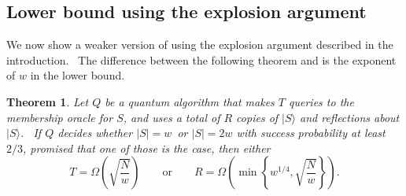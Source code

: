 \documentclass[10pt,a4paper]{article}
\newtheorem{theorem}{Theorem}
\newcommand{\<}{\langle}
\renewcommand{\>}{\rangle}
\begin{document}
%
\subsection{Lower bound using the explosion argument}
\label{s:explosion}\label{sec:explosion}

We now show a weaker version of  using the explosion argument
described in the introduction. \ The difference between the following
theorem and  is the exponent of $w$ in the lower bound.

\begin{theorem}
\label{thm:explosion}Let $Q$ be a quantum algorithm that makes $T$ queries
to the membership oracle for $S$, and uses a total of $R$ copies of $|S\>$
and reflections about $|S\>$. \ If $Q$ decides whether $\left\vert
S\right\vert =w$\ or $\left\vert S\right\vert =2w$ with success probability
at least $2/3$, promised that one of those is the case, then either
\begin{equation}
T=\Omega \left( \sqrt{\frac{N}{w}}\right) \qquad \text{or}\qquad R=\Omega
\left( \min \left\{ w^{1/4},\sqrt{\frac{N}{w}}\right\} \right) .
\end{equation}
\end{theorem}
\end{document}
